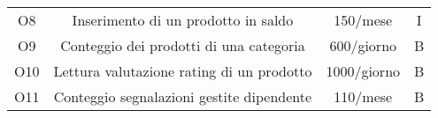 \begin{center}
\begin{tabular}{ |c|c|c|c|}
\multirow{3}{6em}{O8} & \multirow{3}{8em}{Inserimento di un prodotto in saldo} & \multirow{3}{12em}{150/mese} & \multirow{3}{12em}{I}\\
 & & &\\
 & & &\\
\hline

\multirow{3}{6em}{O9} & \multirow{3}{8em}{Conteggio dei prodotti di una categoria} & \multirow{3}{12em}{600/giorno} & \multirow{3}{12em}{B}\\
 & & &\\
 & & &\\
\hline

\multirow{3}{6em}{O10} & \multirow{3}{8em}{Lettura valutazione rating di un prodotto} & \multirow{3}{12em}{1000/giorno} & \multirow{3}{12em}{B}\\
 & & &\\
 & & &\\
\hline

\multirow{3}{6em}{O11} & \multirow{3}{8em}{Conteggio segnalazioni gestite dipendente} & \multirow{3}{12em}{110/mese} & \multirow{3}{12em}{B}\\
 & & &\\
 & & &\\
\hline

\end{tabular}
\end{center}